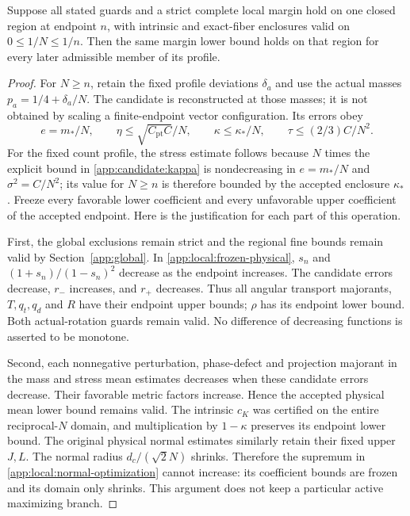 \begin{lemma}\label{app:local:propagation}
Suppose all stated guards and a strict complete local margin hold on
one closed region at endpoint $n$, with intrinsic and exact-fiber
enclosures valid on $0\le1/N\le1/n$. Then the same margin lower bound
holds on that region for every later admissible member of its profile.
\end{lemma}
\begin{proof}
For $N\ge n$, retain the fixed profile deviations $\delta_a$ and use
the actual masses $p_a=1/4+\delta_a/N$. The candidate is reconstructed
at those masses; it is not obtained by scaling a finite-endpoint vector
configuration. Its errors obey
\[
 e=m_*/N,\qquad \eta\le\sqrt{C_{\mathrm{pt}}C}/N,\qquad
 \kappa\le\kappa_*/N,\qquad \tau\le(2/3)C/N^2 .
\]
For the fixed count profile, the stress estimate follows because $N$
times the explicit bound in \eqref{app:candidate:kappa} is nondecreasing in $e=m_*/N$ and
$\sigma^2=C/N^2$; its value for $N\ge n$ is therefore bounded by the
accepted enclosure $\kappa_*$.
Freeze every favorable lower coefficient and every unfavorable upper
coefficient of the accepted endpoint. Here is the justification for
each part of this operation.

First, the global exclusions remain strict and the regional fine
bounds remain valid by Section~\ref{app:global}. In
\eqref{app:local:frozen-physical}, $s_n$ and $(1+s_n)/(1-s_n)^2$
decrease as the endpoint increases. The candidate errors decrease,
$r_-$ increases, and $r_+$ decreases. Thus all angular transport
majorants, $T,q_t,q_d$ and $R$ have their endpoint upper bounds;
$\rho$ has its endpoint lower bound. Both actual-rotation guards remain
valid. No difference of decreasing functions is asserted to be
monotone.

Second, each nonnegative perturbation, phase-defect and projection
majorant in the mass and stress mean estimates decreases when these
candidate errors decrease. Their favorable metric factors increase.
Hence the accepted physical mean lower bound remains valid. The
intrinsic $c_K$ was certified on the entire reciprocal-$N$ domain,
and multiplication by $1-\kappa$ preserves its endpoint lower bound.
The original physical normal estimates similarly retain their fixed
upper $J,L$. The normal radius $d_c/(\sqrt2N)$ shrinks. Therefore
the supremum in \eqref{app:local:normal-optimization} cannot increase:
its coefficient bounds are frozen and its domain only shrinks.
This argument does not keep a particular active maximizing branch.


\end{proof}
